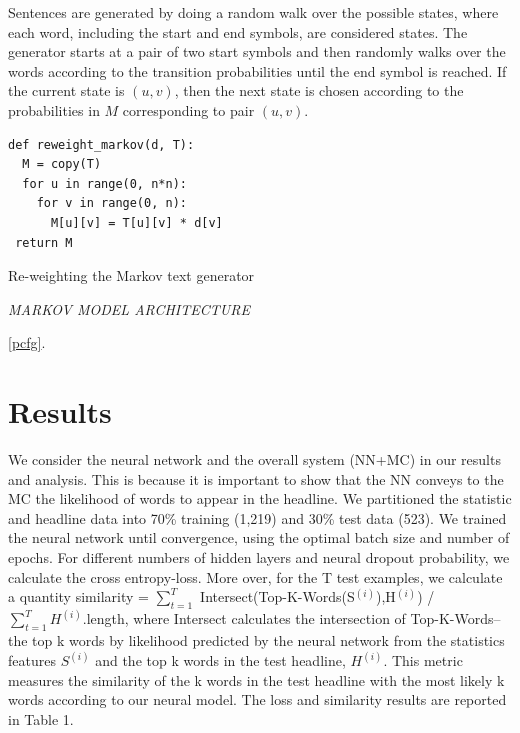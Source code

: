 \documentclass[12pt, journal]{IEEEtran}
\begin{document}
Sentences are generated by doing a random walk over the possible states, where each word, including the start and end symbols, are considered states. The generator starts at a pair of two start symbols and then randomly walks over the words according to the transition probabilities until the end symbol is reached. If the current state is $(u,v)$, then the next state is chosen according to the probabilities in $M$ corresponding to pair $(u,v)$.

\begin{listing}[H]
\begin{verbatim}
def reweight_markov(d, T):
  M = copy(T)
  for u in range(0, n*n):
    for v in range(0, n):
      M[u][v] = T[u][v] * d[v]
 return M
\end{verbatim}
\caption{Re-weighting the Markov text generator}
\label{reweight_markov}
\end{listing}

\emph{MARKOV MODEL ARCHITECTURE}


\ref{pcfg}.

\section{Results}
We consider the neural network and the overall system (NN+MC) in our results and analysis. This is because it is important to show that the NN conveys to the MC the likelihood of words to appear in the headline. We partitioned the statistic and headline data into 70\% training (1,219) and 30\% test data (523). We trained the neural network until convergence, using the optimal batch size and number of epochs. For different numbers of hidden layers and neural dropout probability, we calculate the cross entropy-loss. More over, for the T test examples, we calculate a quantity similarity = $\sum_{t=1}^{T}$ Intersect(Top-K-Words(S$^{(i)}$),H$^{(i)}$) / $\sum_{t=1}^{T} H^{(i)}$.length, where Intersect calculates the intersection of Top-K-Words--the top k words by likelihood predicted by the neural network from the statistics features $S^{(i)}$ and the top k words in the test headline, $H^{(i)}$. This metric measures the similarity of the k words in the test headline with the most likely k words according to our neural model. The loss and similarity results are reported in Table 1. 
\end{document}
